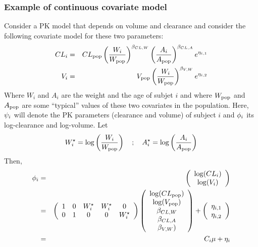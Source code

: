 \subsubsection{Example of continuous covariate model} \label{section_model_contcov}
Consider a PK model that depends on volume and clearance and consider the following covariate model for these two parameters:
\begin{eqnarray*}
CL_i & = & CL_{\rm pop}\left(\frac{W_i}{W_{\rm pop}}\right)^{\beta_{CL,W}} \left(\frac{A_i}{A_{\rm pop}}\right)^{\beta_{CL,A}} e^{\eta_{i,1}} \\
V_i & = & V_{\rm pop}\left(\frac{W_i}{W_{\rm pop}}\right)^{\beta_{V,W}}  e^{\eta_{i,2}}
\end{eqnarray*}
Where $W_i$ and $A_i$ are the weight and the age of subjet $i$ and where $W_{\rm pop}$ and $A_{\rm pop}$ are some ``typical'' values of these two covariates in the population. Here,
${\psi_i}$ will denote the PK parameters (clearance and volume) of subject $i$ and
${{\phi}_i}$ its log-clearance and log-volume.
Let
$$W^\star_i = \log\left(\frac{W_i}{W_{\rm pop}}\right) \quad ; \quad A^\star_i = \log\left(\frac{A_i}{A_{\rm pop}}\right) $$
Then,
\begin{eqnarray*}
\phigi &= & \left( \begin{array}{c}  \log(CL_i) \\  \log(V_i) \\ \end{array} \right) \\
&=& \left( \begin{array}{ccccc}  1 & 0 & W^\star_i & W^\star_i & 0 \\ 0 & 1 & 0 & 0 & W^\star_i \\ \end{array} \right)
\left( \begin{array}{c}  \log(CL_{\rm pop}) \\  \log(V_{\rm pop}) \\ \beta_{CL,W} \\ \beta_{CL,A} \\ \beta_{V,W} ) \\ \end{array} \right)
+  \left( \begin{array}{c}  \eta_{i,1} \\  \eta_{i,2} \\ \end{array} \right) \\
&=& \Covariate_i \fixed_effect + \etagi
\end{eqnarray*}

